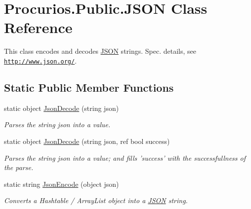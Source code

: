 \hypertarget{classProcurios_1_1Public_1_1JSON}{\section{Procurios.\-Public.\-J\-S\-O\-N Class Reference}
\label{classProcurios_1_1Public_1_1JSON}
}


This class encodes and decodes \hyperlink{classProcurios_1_1Public_1_1JSON}{J\-S\-O\-N} strings. Spec. details, see \href{http://www.json.org/}{\tt http\-://www.\-json.\-org/}.  


\subsection*{Static Public Member Functions}
\begin{DoxyCompactItemize}
\item 
static object \hyperlink{classProcurios_1_1Public_1_1JSON_a8d7ead2469ab5131a06b151bb0530f4f}{Json\-Decode} (string json)
\begin{DoxyCompactList}\small\item\em Parses the string json into a value. \end{DoxyCompactList}\item 
static object \hyperlink{classProcurios_1_1Public_1_1JSON_aeb4d67c1201712a15c017611fa966e62}{Json\-Decode} (string json, ref bool success)
\begin{DoxyCompactList}\small\item\em Parses the string json into a value; and fills 'success' with the successfullness of the parse. \end{DoxyCompactList}\item 
static string \hyperlink{classProcurios_1_1Public_1_1JSON_a34ac0737167543343a0413e29aa36f12}{Json\-Encode} (object json)
\begin{DoxyCompactList}\small\item\em Converts a Hashtable / Array\-List object into a \hyperlink{classProcurios_1_1Public_1_1JSON}{J\-S\-O\-N} string. \end{DoxyCompactList}\end{DoxyCompactItemize}
